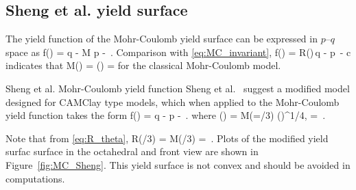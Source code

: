 \subsection{Sheng et al. yield surface}
The yield function of the Mohr-Coulomb yield surface can be expressed in $p$--$q$ space as
\Beq \label{eq:Sheng}
  f(\Bsig) = q - M p -  \,.
\Eeq
Comparison with \eqref{eq:MC_invariant},
\Beq 
  f(\Bsig) = R(\theta)\,q - p~\sin\phi - c\cos\phi  
\Eeq
indicates that
\Beq 
  M(\theta) =  \quad \Tand \quad {}(\theta) = 
\Eeq
for the classical Mohr-Coulomb model. 
\begin{SummaryBox}[label=box:MC_sheng]{Sheng et al. Mohr-Coulomb yield function}
Sheng et al.~\cite{Sheng2000} suggest a modified model designed for CAMClay type models, which when applied
to the Mohr-Coulomb yield function takes the form
\Beq \label{eq:Sheng_mod}
  f(\Bsig) = q -  p -  \,.
\Eeq
where
\Beq
  (\theta) = M(\theta=\pi/3) \left(\right)^{1/4},
  \quad \Tand\quad
  \alpha =  \,.
\Eeq
\end{SummaryBox}
Note that from \eqref{eq:R_theta},
\Beq
  R(\pi/3) =  \quad \implies \quad
  M(\pi/3) = \,.
\Eeq
Plots of the modified yield surfac surface in the octahedral and front view are shown in Figure~\ref{fig:MC_Sheng}.
This yield surface is not convex and should be avoided in computations.
